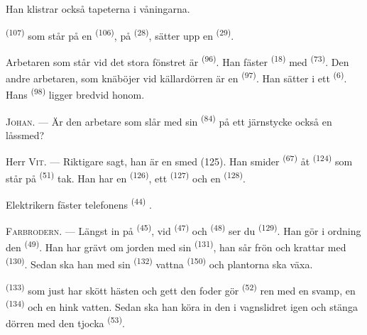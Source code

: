 Han klistrar också tapeterna i våningarna.

 \textsuperscript{(107)} som står på en 
\textsuperscript{(106)}, på  \textsuperscript{(28)}, sätter upp en
 \textsuperscript{(29)}.

Arbetaren som står vid det stora fönstret är  \textsuperscript{(96)}. Han
fäster  \textsuperscript{(18)} med 
\textsuperscript{(73)}. Den andre arbetaren, som knäböjer vid källardörren är en
 \textsuperscript{(97)}. Han sätter i ett  \textsuperscript{(6)}.
Hans  \textsuperscript{(98)} ligger bredvid honom.

\textsc{Johan}. --- Är den arbetare som slår med sin  \textsuperscript{(84)}
på ett järnstycke också en låssmed?

Herr \textsc{Vit}. --- Riktigare sagt, han är en smed (125). Han smider
 \textsuperscript{(67)} åt 
\textsuperscript{(124)} som står på  \textsuperscript{(51)} tak. Han har
en  \textsuperscript{(126)}, ett  \textsuperscript{(127)} och en
 \textsuperscript{(128)}.

Elektrikern fäster telefonens  \textsuperscript{(44)}
.

\VUsaut{3.0mm}

\textsc{Farbrodern}. --- Längst in på  \textsuperscript{(45)}, vid
 \textsuperscript{(47)} och  \textsuperscript{(48)} ser du
 \textsuperscript{(129)}. Han gör i ordning den
 \textsuperscript{(49)}. Han har grävt om jorden med sin
 \textsuperscript{(131)}, han sår frön och krattar med 
\textsuperscript{(130)}. Sedan ska han med sin
 \textsuperscript{(132)} vattna 
\textsuperscript{(150)} och plantorna ska växa.

 \textsuperscript{(133)} som just har skött hästen och gett
den foder gör  \textsuperscript{(52)} ren med en svamp, en
 \textsuperscript{(134)} och en hink vatten. Sedan ska han
köra in den i vagnslidret igen och stänga dörren med den tjocka 
\textsuperscript{(53)}.


